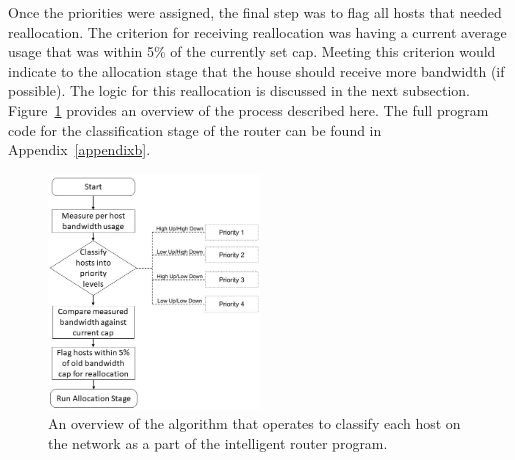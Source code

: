 Once the priorities were assigned, the final step was to flag all hosts that needed reallocation.
The criterion for receiving reallocation was having a current average usage that was within 5\% of the currently set cap.
Meeting this criterion would indicate to the allocation stage that the house should receive more bandwidth (if possible).
The logic for this reallocation is discussed in the next subsection.
Figure~\ref{classification} provides an overview of the process described here.
The full program code for the classification stage of the router can be found in Appendix~\ref{appendixb}.
\begin{figure}[!ht]
    \centering
    \includegraphics[width=0.5\textwidth,keepaspectratio]{Images/Chpt4/Flowchart_Classification_Updated.png}
    \caption{An overview of the algorithm that operates to classify each host on the network as a part of the intelligent router program.}
    \label{classification}
\end{figure}


